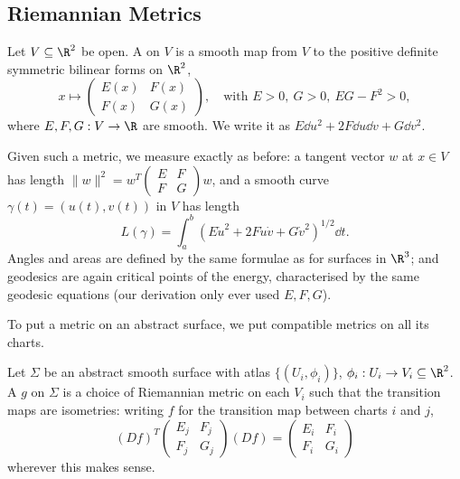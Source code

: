 \subsection{Riemannian Metrics}

\begin{definition}
    Let $V \subseteq \R^2$ be open. A  on $V$ is a smooth map from $V$ to the positive definite symmetric bilinear forms on $\R^2$,
    $$
    x \mapsto \begin{pmatrix} E(x) & F(x) \\ F(x) & G(x) \end{pmatrix}, \quad \text{with } E > 0,\ G > 0,\ EG - F^2 > 0,
    $$
    where $E, F, G: V \rightarrow \R$ are smooth. We write it as $E \dd u^2 + 2F \dd u \dd v + G \dd v^2$.
\end{definition}

Given such a metric, we measure exactly as before: a tangent vector $w$ at $x \in V$ has length
$\|w\|^2 = w^T \left(\begin{smallmatrix} E & F \\ F & G\end{smallmatrix}\right) w$, and a smooth curve $\gamma(t) = (u(t), v(t))$ in $V$ has length
$$
L(\gamma) = \int_a^b \left(E \dot u^2 + 2F \dot u \dot v + G \dot v^2\right)^{1/2} \dd t.
$$
Angles and areas are defined by the same formulae as for surfaces in $\R^3$; and geodesics are again critical points of the energy, characterised by the same geodesic equations (our derivation only ever used $E, F, G$).

To put a metric on an abstract surface, we put compatible metrics on all its charts.

\begin{definition}
    Let $\Sigma$ be an abstract smooth surface with atlas $\{(U_i, \phi_i)\}$, $\phi_i: U_i \rightarrow V_i \subseteq \R^2$. A  $g$ on $\Sigma$ is a choice of Riemannian metric on each $V_i$ such that the transition maps are isometries: writing $f$ for the transition map between charts $i$ and $j$,
    $$
    (Df)^T \begin{pmatrix} E_j & F_j \\ F_j & G_j\end{pmatrix} (Df) = \begin{pmatrix} E_i & F_i \\ F_i & G_i \end{pmatrix}
    $$
    wherever this makes sense.
\end{definition}

